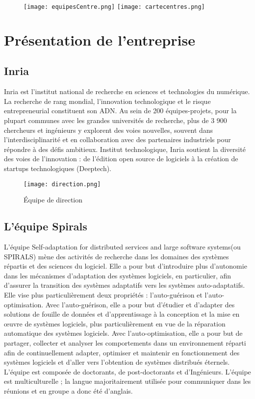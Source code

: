 \documentclass[oneside,a4paper,12pt]{article}
\begin{document}
\begin{figure}[h]
	\centering
	\texttt{[image: equipesCentre.png]}
	\texttt{[image: cartecentres.png]}
\end{figure}

\section{Présentation de l'entreprise}
\subsection{Inria}
Inria est l’institut national de recherche en sciences et technologies du numérique. La recherche de rang mondial, l’innovation technologique et le risque entrepreneurial constituent son ADN. Au sein de 200 équipes-projets, pour la plupart communes avec les grandes universités de recherche, plus de 3 900 chercheurs et ingénieurs y explorent des voies nouvelles, souvent dans l’interdisciplinarité et en collaboration avec des partenaires industriels pour répondre à des défis ambitieux.
Institut technologique, Inria soutient la diversité des voies de l’innovation : de l’édition open source de logiciels à la création de startups technologiques (Deeptech).

\begin{figure}[h]
	\centering
	\texttt{[image: direction.png]}
	\caption{\'Equipe de direction}
\end{figure}

\subsection{L'équipe Spirals}
L'équipe Self-adaptation for distributed services and large software systems(ou SPIRALS) mène des activités de recherche dans les domaines des systèmes répartis et des sciences du logiciel. 
Elle a pour but d'introduire plus d'autonomie dans les mécanismes d'adaptation des systèmes logiciels, en particulier, afin d'assurer la transition des systèmes adaptatifs vers les systèmes auto-adaptatifs. 
Elle vise plus particulièrement deux propriétés : l'auto-guérison et l'auto-optimisation. 
Avec l'auto-guérison, elle a pour but d'étudier et d'adapter des solutions de fouille de données et d'apprentissage à la conception et la mise en œuvre de systèmes logiciels, plus particulièrement en vue de la réparation automatique des systèmes logiciels. 
Avec l'auto-optimisation, elle a pour but de partager, collecter et analyser les comportements dans un environnement réparti afin de continuellement adapter, optimiser et maintenir en fonctionnement des systèmes logiciels et d'aller vers l'obtention de systèmes distribués éternels.
L'équipe est composée de doctorants, de post-doctorants et d'Ingénieurs. L'équipe est multiculturelle ; la langue majoritairement utilisée pour communiquer dans les réunions et en groupe a donc été d'anglais.
\end{document}
